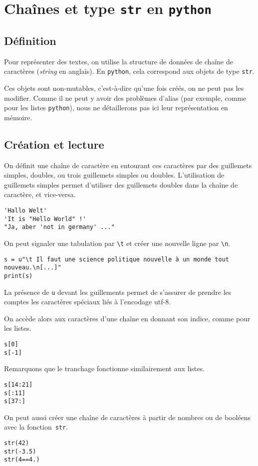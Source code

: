 \section{Chaînes et type \texttt{str} en \texttt{python}}

\subsection{Définition}

Pour représenter des textes, on utilise la structure de données de \og chaîne de caractères \fg{} (\emph{string} en anglais). En \texttt{python}, cela correspond aux objets de type \texttt{str}.

Ces objets sont non-mutables, c'est-à-dire qu'une fois créés, on ne peut pas les modifier. 
Comme il ne peut y avoir des problèmes d'alias (par exemple, comme pour les listes \texttt{python}), nous ne détaillerons pas ici leur représentation en mémoire. 

\subsection{Création et lecture}

On définit une chaîne de caractère en entourant ces caractères par des guillemets simples, doubles, ou trois guillemets simples ou doubles. 
L'utilisation de guillemets simples permet d'utiliser des guillemets doubles dans la chaîne de caractère, et vice-versa.
\begin{lstlisting}
'Hallo Welt'
'It is "Hello World" !'
"Ja, aber 'not in germany' ..."
\end{lstlisting}

On peut signaler une tabulation par \texttt{\textbackslash t} et créer une nouvelle ligne par \texttt{\textbackslash n}.

\begin{lstlisting}
s = u"\t Il faut une science politique nouvelle à un monde tout nouveau.\n[...]"
print(s)
\end{lstlisting}


\begin{remarque}
La présence de \texttt{u} devant les guillements permet de s'assurer de prendre les comptes les caractères spéciaux liés à l'encodage utf-8.
\end{remarque}

On accède alors aux caractères d'une chaîne en donnant son indice, comme pour les listes. 
\begin{lstlisting}
s[0]
s[-1]
\end{lstlisting}
Remarquons que le tranchage fonctionne similairement aux listes.
\begin{lstlisting}
s[14:21]
s[:11]
s[37:]
\end{lstlisting}
On peut aussi créer une chaîne de caractères à partir de nombres ou de booléens avec la fonction~\texttt{str}.
\begin{lstlisting}
str(42)
str(-3.5)
str(4==4.)
\end{lstlisting}

